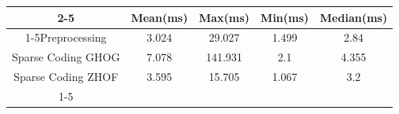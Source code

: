 \documentclass{standalone}
\begin{document}
 
 \begin{tabular}{|c |c |c |c |c |}
\cline{2-5}\cline{2-5} \multicolumn{1}{c |}{ } & Mean(ms) & Max(ms) & Min(ms) & Median(ms)\\ 
\cline{1-5}Preprocessing & 3.024 & 29.027 & 1.499 & 2.84\\ 
 \hhline{|=|=|=|=|=|}Sparse Coding GHOG & 7.078 & 141.931 & 2.1 & 4.355\\ 
 \hhline{|=|=|=|=|=|}Sparse Coding ZHOF & 3.595 & 15.705 & 1.067 & 3.2\\ 
 \cline{1-5}\hline \end{tabular}
 
\end{document}
